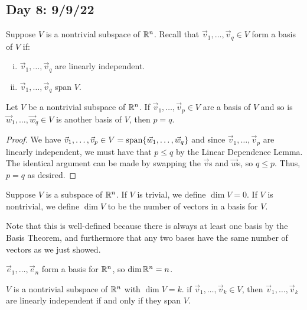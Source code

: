 \documentclass[main.tex]{subfiles}
\begin{document}
\subsection{Day 8: 9/9/22}

Suppose $V$ is a nontrivial subspace of $\mathbb R^n$. Recall that $\vec{v}_1, \ldots , \vec{v}_q \in V$ form a basis of $V$ if:
\begin{enumerate}[(i)]
    \item $\vec{v}_1, \ldots , \vec{v}_q$ are linearly independent.
    \item $\vec{v}_1, \ldots , \vec{v}_q$ span $V$.
\end{enumerate}

\begin{theorem}
    Let $V$ be a nontrivial subspace of $\mathbb R^n$. If $\vec{v}_1, \ldots , \vec{v}_p\in V$ are a basis of $V$ and so is $\vec{w}_1, \ldots , \vec{w}_q\in V$ is another basis of $V$, then $p = q$.
\end{theorem}

\begin{proof}
    We have $\vec{v}_1, \ldots , \vec{v}_p\in V = \operatorname{span}\{\vec{w}_1, \ldots , \vec{w}_q\}$ and since $\vec{v}_1, \ldots , \vec{v}_p$ are linearly independent, we must have that $p\le q$ by the Linear Dependence Lemma. The identical argument can be made by swapping the $\vec{v}$s and $\vec{w}$s, so $q\le p$. Thus, $p = q$ as desired.
\end{proof}

\begin{definition}[Dimension]
    Suppose $V$ is a subspace of $\mathbb R^n$. If $V$ is trivial, we define $\dim V = 0$. If $V$ is nontrivial, we define $\dim V$ to be the number of vectors in a basis for $V$.
\end{definition}

Note that this is well-defined because there is always at least one basis by the Basis Theorem, and furthermore that any two bases have the same number of vectors as we just showed.

\begin{example}
    $\vec{e}_1, \ldots , \vec{e}_n$ form a basis for $\mathbb R^n$, so $\dim \mathbb R^n = n$.
\end{example}

\begin{theorem}
    $V$ is a nontrivial subspace of $\mathbb R^n$ with $\dim V = k$. if $\vec{v}_1, \ldots , \vec{v}_k\in V$, then $\vec{v}_1, \ldots , \vec{v}_k$ are linearly independent if and only if they span $V$.
\end{theorem}
\end{document}
